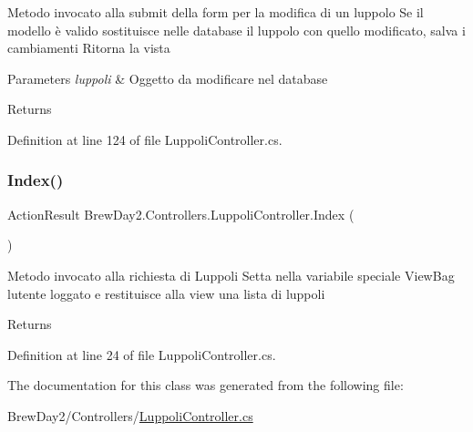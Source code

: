 Metodo invocato alla submit della form per la modifica di un luppolo Se il modello è valido sostituisce nelle database il luppolo con quello modificato, salva i cambiamenti Ritorna la vista 


\begin{DoxyParams}{Parameters}
{\em luppoli} & Oggetto da modificare nel database\\
\hline
\end{DoxyParams}
\begin{DoxyReturn}{Returns}

\end{DoxyReturn}


Definition at line 124 of file Luppoli\+Controller.\+cs.

\mbox{\label{class_brew_day2_1_1_controllers_1_1_luppoli_controller_a70b87982bc0a3e78433c6a3541377dbe}} 
\subsubsection{\texorpdfstring{Index()}{Index()}}
{\footnotesize\ttfamily Action\+Result Brew\+Day2.\+Controllers.\+Luppoli\+Controller.\+Index (\begin{DoxyParamCaption}{ }\end{DoxyParamCaption})}



Metodo invocato alla richiesta di Luppoli Setta nella variabile speciale View\+Bag l\textquotesingle{}utente loggato e restituisce alla view una lista di luppoli 

\begin{DoxyReturn}{Returns}

\end{DoxyReturn}


Definition at line 24 of file Luppoli\+Controller.\+cs.



The documentation for this class was generated from the following file\+:\begin{DoxyCompactItemize}
\item 
Brew\+Day2/\+Controllers/\mbox{\hyperlink{_luppoli_controller_8cs}{Luppoli\+Controller.\+cs}}\end{DoxyCompactItemize}
